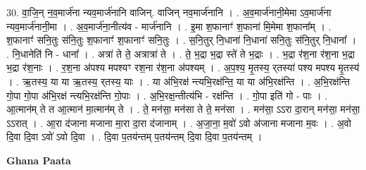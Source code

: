 \documentclass[17pt]{extarticle}
\begin{document}
30. वा॒जि॒न् न॒व॒मार्ज॑ना न्यव॒मार्ज॑नानि वाजिन्. वाजिन् नव॒मार्ज॑नानि । . अ॒व॒मार्ज॑नानी॒मेमा ऽव॒मार्ज॑ना न्यव॒मार्ज॑नानी॒मा । . अ॒व॒मार्ज॑ना॒नीत्य॑व - मार्ज॑नानि । . इ॒मा श॒फानाꣳ॑ श॒फाना॑ मि॒मेमा श॒फाना᳚म् । . श॒फानाꣳ॑ सनि॒तुः स॑नि॒तुः श॒फानाꣳ॑ श॒फानाꣳ॑ सनि॒तुः । . स॒नि॒तुर् नि॒धाना॑ नि॒धाना॑ सनि॒तुः स॑नि॒तुर् नि॒धाना᳚ । . नि॒धानेति॑ नि - धाना᳚ । . अत्रा॑ ते ते॒ अत्रात्रा॑ ते । . ते॒ भ॒द्रा भ॒द्रा स्ते॑ ते भ॒द्राः । . भ॒द्रा र॑श॒ना र॑श॒ना भ॒द्रा भ॒द्रा र॑श॒नाः । . र॒श॒ना अ॑पश्य मपश्यꣳ रश॒ना र॑श॒ना अ॑पश्यम् । . अ॒प॒श्य॒ मृ॒तस्य॒ र्‌तस्या॑ पश्य मपश्य मृ॒तस्य॑ । . ऋ॒तस्य॒ या या ऋ॒तस्य॒ र्‌तस्य॒ याः । . या अ॑भि॒रक्ष॑ न्त्यभि॒रक्ष॑न्ति॒ या या अ॑भि॒रक्ष॑न्ति । . अ॒भि॒रक्ष॑न्ति गो॒पा गो॒पा अ॑भि॒रक्ष॑ न्त्यभि॒रक्ष॑न्ति गो॒पाः । . अ॒भि॒रक्ष॒न्तीत्य॑भि - रक्ष॑न्ति । . गो॒पा इति॑ गो - पाः । . आ॒त्मान॑म् ते त आ॒त्मान॑ मा॒त्मान॑म् ते । . ते॒ मन॑सा॒ मन॑सा ते ते॒ मन॑सा । . मन॑सा॒ ऽऽरा दा॒रान् मन॑सा॒ मन॑सा॒ ऽऽरात् । . आ॒रा द॑जाना मजाना मा॒रा दा॒रा द॑जानाम् । . अ॒जा॒ना॒ म॒वो॑ ऽवो अ॑जाना मजाना म॒वः । . अ॒वो दि॒वा दि॒वा ऽवो॑ ऽवो दि॒वा । . दि॒वा प॒तय॑न्तम् प॒तय॑न्तम् दि॒वा दि॒वा प॒तय॑न्तम् । \newline

\textbf{Ghana Paata } \newline
\end{document}
